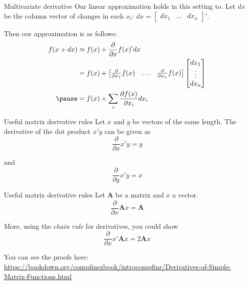 \documentclass[aspectratio=169,t,11pt,table]{beamer}
\begin{document}
\begin{frame}{Multivariate derivative}
  Our linear approximation holds in this setting to. Let $dx$ be the column vector of changes in each $x_i$: $dx = \begin{bmatrix}dx_1 & \dots & dx_n\end{bmatrix}'$.

  \pause
  \bigskip
  Then our approximation is as follows:
  \begin{align*}
    f(x + dx)  &\approx f(x) + \frac{\partial}{\partial x} f(x)' dx \\
    &= 
    f(x) +
    \begin{bmatrix} \frac{\partial}{\partial x_1} f(x) & \dots & \frac{\partial}{\partial x_n} f(x) \end{bmatrix} 
    \begin{bmatrix}dx_1 \\ \vdots \\ dx_n\end{bmatrix} \\ 
    \pause
    &= f(x) + \sum_i \frac{\partial f(x)}{\partial x_i} dx_i
  \end{align*}
\end{frame}

\begin{frame}{Useful matrix derivative rules}
  Let $x$ and $y$ be vectors of the same length. The derivative of the dot product $x' y$ can be given as
  $$
    \frac{\partial}{\partial x} x' y = y
  $$

  and 
  $$
    \frac{\partial}{\partial y} x' y = x
  $$
\end{frame}

\begin{frame}{Useful matrix derivative rules}
  Let $\bm{A}$ be a matrix and $x$ a vector.
  $$
    \frac{\partial}{\partial x} \bm{A}x = \bm{A}
  $$

  More, using the \emph{chain rule} for derivatives, you could show
  $$
    \frac{\partial}{\partial x} x'\bm{A}x = 2\bm{A}x
  $$
  
  \bigskip
  You can see the proofs here: \url{https://bookdown.org/compfinezbook/introcompfinr/Derivatives-of-Simple-Matrix-Functions.html}
\end{frame}
\end{document}
